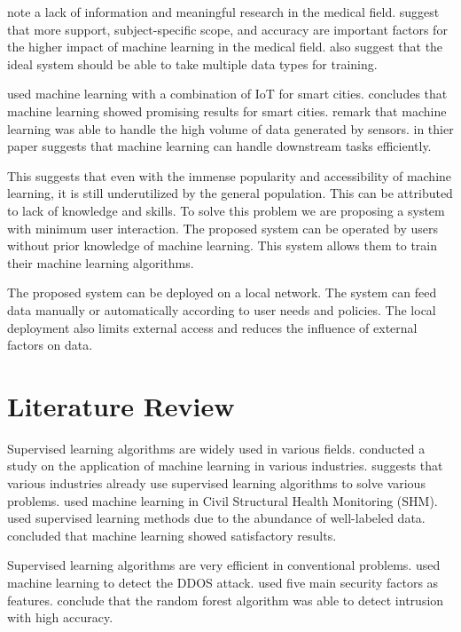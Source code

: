 \documentclass[a4paper,fleqn]{cas-dc}
\begin{document}
\cite*{ref_paper_24} note a lack of information and meaningful research in the medical field. \citeauthor{ref_paper_24} suggest that more support, subject-specific scope, and accuracy are important factors for the higher impact of machine learning in the medical field. \citeauthor{ref_paper_24} also suggest that the ideal system should be able to take multiple data types for training.

\cite*{ref_paper_29} used machine learning with a combination of IoT for smart cities. \citeauthor{ref_paper_29} concludes that machine learning showed promising results for smart cities. \citeauthor{ref_paper_29} remark that machine learning was able to handle the high volume of data generated by sensors. \cite*{ref_paper_12} in thier paper suggests that machine learning can handle downstream tasks efficiently.

This suggests that even with the immense popularity and accessibility of machine learning, it is still underutilized by the general population. This can be attributed to lack of knowledge and skills. To solve this problem we are proposing a system with minimum user interaction. The proposed system can be operated by users without prior knowledge of machine learning. This system allows them to train their machine learning algorithms.

The proposed system can be deployed on a local network. The system can feed data manually or automatically according to user needs and policies. The local deployment also limits external access and reduces the influence of external factors on data.

\section{Literature Review}\label{sec:literature_review}

Supervised learning algorithms are widely used in various fields. \cite*{ref_paper_14} conducted a study on the application of machine learning in various industries. \citeauthor{ref_paper_14} suggests that various industries already use supervised learning algorithms to solve various problems. \cite*{ref_paper_6} used machine learning in Civil Structural Health Monitoring (SHM). \citeauthor{ref_paper_6} used supervised learning methods due to the abundance of well-labeled data. \citeauthor{ref_paper_6} concluded that machine learning showed satisfactory results.

Supervised learning algorithms are very efficient in conventional problems. \cite*{ref_paper_9} used machine learning to detect the DDOS attack. \citeauthor{ref_paper_9} used five main security factors as features. \citeauthor{ref_paper_9} conclude that the random forest algorithm was able to detect intrusion with high accuracy.
\end{document}
